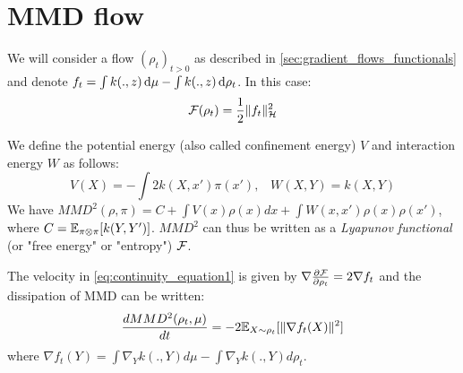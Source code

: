 \section{MMD flow}\label{sec:mmd_flow}



We will consider a flow $(\rho_t)_{t>0}$ as described in \cref{sec:gradient_flows_functionals} and denote $f_t= \int k(.,z)\mathop{}\!\mathrm{d} \mu - \int k(.,z)\mathop{}\!\mathrm{d} \rho_t$. In this case:
\begin{equation}
{{\mathcal F}}(\rho_t)=\frac{1}{2}\|f_t\|^2_{{{\mathcal H}}}
\end{equation} 

We define the potential energy (also called confinement energy) $V$ and interaction energy $W$ as follows:
\begin{equation}
V(X)=-\int 2 k(X,x')\pi(x')\text{,} \quad
W(X,Y)=k(X,Y)
\end{equation}
We have $MMD^2(\rho,\pi)=C+ \int V(x) \rho(x)dx + \int W(x,x')\rho(x)\rho(x')$, where $C={{\mathbb E}}_{\pi\otimes \pi}[k(Y,Y')]$. $MMD^2$ can thus be written as a \textit{Lyapunov functional} (or "free energy" or "entropy") ${{\mathcal F}}$. 


\begin{proposition}\label{prop:mmd_flow}
 The velocity in \eqref{eq:continuity_equation1} is given by $\nabla \frac{\partial{{{\mathcal F}}}}{\partial{\rho_t}}=2 \nabla f_t$ and the dissipation of MMD can be written:  
	\begin{equation}
	\frac{d MMD^2(\rho_t, \mu)}{dt}=-2 {{\mathbb E}}_{X \sim \rho_t}[\|\nabla f_t(X)\|^2]
	\end{equation}
	where $\nabla f_t(Y)= \int \nabla_{Y}k(.,Y) d\mu -  \int \nabla_{Y}k(.,Y) d\rho_t$.
\end{proposition}

